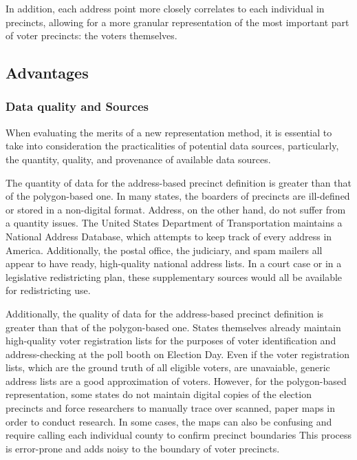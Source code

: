 \documentclass[11pt]{article}
\begin{document}
In addition, each address point more closely correlates to each individual in precincts, allowing for a more granular representation of the most important part of voter precincts: the voters themselves. 


\subsection{Advantages}
\label{sec:org8020aca}

\subsubsection{Data quality and Sources}
\label{sec:orgc0c7063}
When evaluating the merits of a new representation method, it is essential to take into consideration the practicalities of potential data sources, particularly, the quantity, quality, and provenance of available data sources. 

The quantity of data for the address-based precinct definition is greater than that of the polygon-based one. In many states, the boarders of precincts are ill-defined or stored in a non-digital format. Address, on the other hand, do not suffer from a quantity issues. The United States Department of Transportation maintains a National Address Database, which attempts to keep track of every address in America. Additionally, the postal office, the judiciary, and spam mailers all appear to have ready, high-quality national address lists. In a court case or in a legislative redistricting plan, these supplementary sources would all be available for redistricting use.

Additionally, the quality of data for the address-based precinct definition is greater than that of the polygon-based one. States themselves already maintain high-quality voter registration lists for the purposes of voter identification and address-checking at the poll booth on Election Day. Even if the voter registration lists, which are the ground truth of all eligible voters, are unavaiable, generic address lists are a good approximation of voters. However, for the polygon-based representation, some states do not maintain digital copies of the election precincts and force researchers to manually trace over scanned, paper maps in order to conduct research. In some cases, the maps can also be confusing and require calling each individual county to confirm precinct boundaries This process is error-prone and adds noisy to the boundary of voter precincts.
\end{document}
